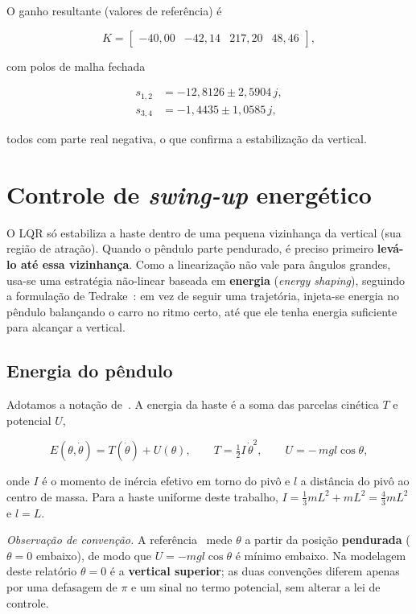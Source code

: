 \documentclass[brazil, 12pt]{article}
\begin{document}
O ganho resultante (valores de referência) é

\[
K = \begin{bmatrix} -40{,}00 & -42{,}14 & 217{,}20 & 48{,}46 \end{bmatrix},
\]

com polos de malha fechada

\[
\begin{aligned}
s_{1,2} &= -12{,}8126 \pm 2{,}5904\,j, \\
s_{3,4} &= -1{,}4435 \pm 1{,}0585\,j,
\end{aligned}
\]

todos com parte real negativa, o que confirma a estabilização da vertical.

\section{Controle de \emph{swing-up} energético}

O LQR só estabiliza a haste dentro de uma pequena vizinhança da vertical (sua
região de atração). Quando o pêndulo parte pendurado, é preciso primeiro
\textbf{levá-lo até essa vizinhança}. Como a linearização não vale para ângulos
grandes, usa-se uma estratégia não-linear baseada em \textbf{energia}
(\emph{energy shaping}), seguindo a formulação de Tedrake~\cite{mit}: em vez de
seguir uma trajetória, injeta-se energia no pêndulo balançando o carro no
ritmo certo, até que ele tenha energia suficiente para alcançar a vertical.

\subsection{Energia do pêndulo}

Adotamos a notação de~\cite{mit}. A energia da haste é a soma das parcelas
cinética $T$ e potencial $U$,

\[
E(\theta,\dot{\theta}) = T(\dot{\theta}) + U(\theta),
\qquad
T = \tfrac{1}{2} I\,\dot{\theta}^{2},
\qquad
U = -\,m g l\cos\theta,
\]

onde $I$ é o momento de inércia efetivo em torno do pivô e $l$ a distância do
pivô ao centro de massa. Para a haste uniforme deste trabalho,
$I = \tfrac{1}{3}mL^{2} + mL^{2} = \tfrac{4}{3}mL^{2}$ e $l = L$.

\noindent\emph{Observação de convenção.} A referência~\cite{mit} mede $\theta$ a
partir da posição \textbf{pendurada} ($\theta=0$ embaixo), de modo que
$U=-mgl\cos\theta$ é mínimo embaixo. Na modelagem deste relatório $\theta=0$ é a
\textbf{vertical superior}; as duas convenções diferem apenas por uma defasagem
de $\pi$ e um sinal no termo potencial, sem alterar a lei de controle.
\end{document}
